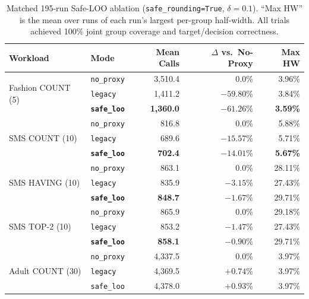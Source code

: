 \begin{table}[t]
\centering
\footnotesize
\setlength{\tabcolsep}{3.5pt}
\caption{Matched 195-run Safe-LOO ablation (\texttt{safe\_rounding=True}, $\delta=0.1$). ``Max HW'' is the mean over runs of each run's largest per-group half-width. All trials achieved 100\% joint group coverage and target/decision correctness.}
\label{tab:s1-ablation}
\begin{tabular}{@{}llrrr@{}}
\toprule
Workload & Mode & Mean Calls & $\Delta$ vs.\ No-Proxy & Max HW \\
\midrule
\multirow{3}{*}{Fashion COUNT (5)}
& \texttt{no\_proxy} & 3,510.4 & 0.0\% & 3.96\% \\
& \texttt{legacy} & 1,411.2 & $-59.80\%$ & 3.84\% \\
& \textbf{\texttt{safe\_loo}} & \textbf{1,360.0} & \textbf{$-61.26\%$} & \textbf{3.59\%} \\
\midrule
\multirow{3}{*}{SMS COUNT (10)}
& \texttt{no\_proxy} & 816.8 & 0.0\% & 5.88\% \\
& \texttt{legacy} & 689.6 & $-15.57\%$ & 5.71\% \\
& \textbf{\texttt{safe\_loo}} & \textbf{702.4} & \textbf{$-14.01\%$} & \textbf{5.67\%} \\
\midrule
\multirow{3}{*}{SMS HAVING (10)}
& \texttt{no\_proxy} & 863.1 & 0.0\% & 28.11\% \\
& \texttt{legacy} & 835.9 & $-3.15\%$ & 27.43\% \\
& \textbf{\texttt{safe\_loo}} & \textbf{848.7} & \textbf{$-1.67\%$} & 29.71\% \\
\midrule
\multirow{3}{*}{SMS TOP-2 (10)}
& \texttt{no\_proxy} & 865.9 & 0.0\% & 29.18\% \\
& \texttt{legacy} & 853.2 & $-1.47\%$ & 27.43\% \\
& \textbf{\texttt{safe\_loo}} & \textbf{858.1} & \textbf{$-0.90\%$} & 29.71\% \\
\midrule
\multirow{3}{*}{Adult COUNT (30)}
& \texttt{no\_proxy} & 4,337.5 & 0.0\% & 3.97\% \\
& \texttt{legacy} & 4,369.5 & $+0.74\%$ & 3.97\% \\
& \texttt{safe\_loo} & 4,378.0 & $+0.93\%$ & 3.97\% \\
\bottomrule
\end{tabular}
\end{table}

